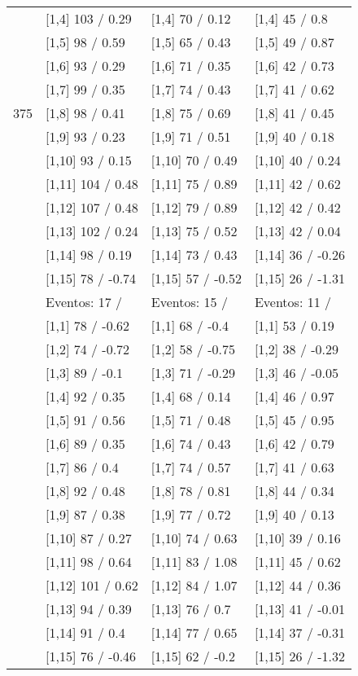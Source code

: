 \begin{table}
\begin{tabular}[t]{llll}
 & {}[1,4] 103  / 0.29 & {}[1,4] 70  / 0.12 & {}[1,4] 45  / 0.8\\
 & {}[1,5] 98  / 0.59 & {}[1,5] 65  / 0.43 & {}[1,5] 49  / 0.87\\
 & {}[1,6] 93  / 0.29 & {}[1,6] 71  / 0.35 & {}[1,6] 42  / 0.73\\
 & {}[1,7] 99  / 0.35 & {}[1,7] 74  / 0.43 & {}[1,7] 41  / 0.62\\
375 & {}[1,8] 98  / 0.41 & {}[1,8] 75  / 0.69 & {}[1,8] 41  / 0.45\\
\addlinespace
 & {}[1,9] 93  / 0.23 & {}[1,9] 71  / 0.51 & {}[1,9] 40  / 0.18\\
 & {}[1,10] 93  / 0.15 & {}[1,10] 70  / 0.49 & {}[1,10] 40  / 0.24\\
 & {}[1,11] 104  / 0.48 & {}[1,11] 75  / 0.89 & {}[1,11] 42  / 0.62\\
 & {}[1,12] 107  / 0.48 & {}[1,12] 79  / 0.89 & {}[1,12] 42  / 0.42\\
 & {}[1,13] 102  / 0.24 & {}[1,13] 75  / 0.52 & {}[1,13] 42  / 0.04\\
\addlinespace
 & {}[1,14] 98  / 0.19 & {}[1,14] 73  / 0.43 & {}[1,14] 36  / -0.26\\
 & {}[1,15] 78  / -0.74 & {}[1,15] 57  / -0.52 & {}[1,15] 26  / -1.31\\
 & Eventos:  17 / & Eventos:  15 / & Eventos:  11 /\\
 & {}[1,1] 78  / -0.62 & {}[1,1] 68  / -0.4 & {}[1,1] 53  / 0.19\\
 & {}[1,2] 74  / -0.72 & {}[1,2] 58  / -0.75 & {}[1,2] 38  / -0.29\\
\addlinespace
 & {}[1,3] 89  / -0.1 & {}[1,3] 71  / -0.29 & {}[1,3] 46  / -0.05\\
 & {}[1,4] 92  / 0.35 & {}[1,4] 68  / 0.14 & {}[1,4] 46  / 0.97\\
 & {}[1,5] 91  / 0.56 & {}[1,5] 71  / 0.48 & {}[1,5] 45  / 0.95\\
 & {}[1,6] 89  / 0.35 & {}[1,6] 74  / 0.43 & {}[1,6] 42  / 0.79\\
 & {}[1,7] 86  / 0.4 & {}[1,7] 74  / 0.57 & {}[1,7] 41  / 0.63\\
\addlinespace
500 & {}[1,8] 92  / 0.48 & {}[1,8] 78  / 0.81 & {}[1,8] 44  / 0.34\\
 & {}[1,9] 87  / 0.38 & {}[1,9] 77  / 0.72 & {}[1,9] 40  / 0.13\\
 & {}[1,10] 87  / 0.27 & {}[1,10] 74  / 0.63 & {}[1,10] 39  / 0.16\\
 & {}[1,11] 98  / 0.64 & {}[1,11] 83  / 1.08 & {}[1,11] 45  / 0.62\\
 & {}[1,12] 101  / 0.62 & {}[1,12] 84  / 1.07 & {}[1,12] 44  / 0.36\\
\addlinespace
 & {}[1,13] 94  / 0.39 & {}[1,13] 76  / 0.7 & {}[1,13] 41  / -0.01\\
 & {}[1,14] 91  / 0.4 & {}[1,14] 77  / 0.65 & {}[1,14] 37  / -0.31\\
 & {}[1,15] 76  / -0.46 & {}[1,15] 62  / -0.2 & {}[1,15] 26  / -1.32\\
\bottomrule
\end{tabular}
\end{table}
